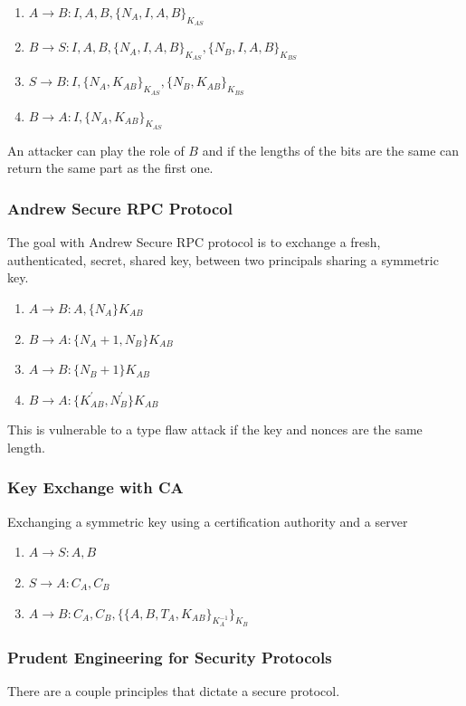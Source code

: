 \documentclass[11pt]{article}
\begin{document}
\begin{enumerate}
    \item $A \rightarrow B : I, A, B, \{ N_A, I, A, B \}_{K_{AS}}$
    \item $B \rightarrow S : I, A, B, \{ N_A, I, A, B \}_{K_{AS}}, \{ N_B, I, A, B \}_{K_{BS}}$
    \item $S \rightarrow B : I, \{ N_A, K_{AB} \}_{K_{AS}}, \{ N_B, K_{AB} \}_{K_{BS}}$
    \item $B \rightarrow A : I, \{ N_A, K_{AB} \}_{K_{AS}}$
\end{enumerate}

An attacker can play the role of $B$ and if the lengths of the bits are the same can return the same part as the first one.

\subsubsection{Andrew Secure RPC Protocol}
The goal with Andrew Secure RPC protocol is to exchange a fresh, authenticated, secret, shared key, between two principals sharing a symmetric key.

\begin{enumerate}
    \item $A \rightarrow B : A, \{ N_A \}K_{AB}$
    \item $B \rightarrow A : \{ N_A +1, N_B \}K_{AB} $
    \item $A \rightarrow B : \{ N_B+1 \}K_{AB} $
    \item $B \rightarrow A : \{ K_{AB}^\prime, N_{B}^\prime \}K_{AB} $
\end{enumerate}

This is vulnerable to a type flaw attack if the key and nonces are the same length.

\subsubsection{Key Exchange with CA}
Exchanging a symmetric key using a certification authority and a server
\begin{enumerate}
    \item $A \rightarrow S : A,B$
    \item $S \rightarrow A : C_A, C_B$
    \item $A \rightarrow B : C_A, C_B, \{ \{ A, B, T_A, K_{AB} \}_{K_A^{-1}} \}_{K_B}$
\end{enumerate}

\subsubsection{Prudent Engineering for Security Protocols}
There are a couple principles that dictate a secure protocol.
\end{document}
